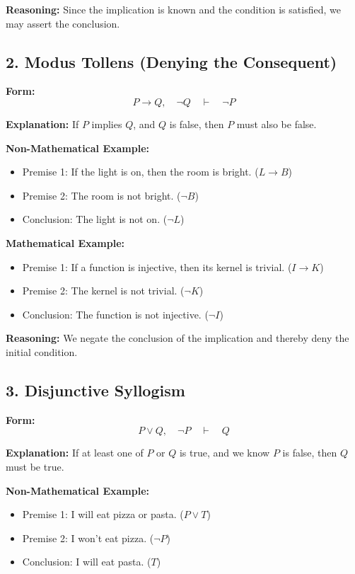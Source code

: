 \documentclass[10pt]{article}
\theoremstyle{plain}
\theoremstyle{definition}
\begin{document}
  \textbf{Reasoning:}  
  Since the implication is known and the condition is satisfied, we may assert the conclusion.
  
  \subsection*{2. Modus Tollens (Denying the Consequent)}
  
  \textbf{Form:}
  \[
  P \rightarrow Q,\quad \lnot Q \quad \vdash \quad \lnot P
  \]
  
  \textbf{Explanation:}  
  If $P$ implies $Q$, and $Q$ is false, then $P$ must also be false.
  
  \textbf{Non-Mathematical Example:}
  \begin{itemize}
  	\item Premise 1: If the light is on, then the room is bright. ($L \rightarrow B$)
  	\item Premise 2: The room is not bright. ($\lnot B$)
  	\item Conclusion: The light is not on. ($\lnot L$)
  \end{itemize}
  
  \textbf{Mathematical Example:}
  \begin{itemize}
  	\item Premise 1: If a function is injective, then its kernel is trivial. ($I \rightarrow K$)
  	\item Premise 2: The kernel is not trivial. ($\lnot K$)
  	\item Conclusion: The function is not injective. ($\lnot I$)
  \end{itemize}
  
  \textbf{Reasoning:}  
  We negate the conclusion of the implication and thereby deny the initial condition.
  
  \subsection*{3. Disjunctive Syllogism}
  
  \textbf{Form:}
  \[
  P \lor Q,\quad \lnot P \quad \vdash \quad Q
  \]
  
  \textbf{Explanation:}  
  If at least one of $P$ or $Q$ is true, and we know $P$ is false, then $Q$ must be true.
  
  \textbf{Non-Mathematical Example:}
  \begin{itemize}
  	\item Premise 1: I will eat pizza or pasta. ($P \lor T$)
  	\item Premise 2: I won’t eat pizza. ($\lnot P$)
  	\item Conclusion: I will eat pasta. ($T$)
  \end{itemize}
  
\end{document}

